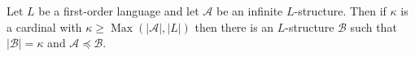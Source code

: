 \documentclass[12pt]{article}
\newcommand{\card}[1]{\lvert #1 \rvert}
\begin{document}
Let $L$ be a first-order language and let $\mathcal{A}$ be an infinite $L$-structure.  Then if $\kappa$ is a cardinal with $\kappa\geq\operatorname{Max}(\card{\mathcal{A}}, \card{L})$ then there is an $L$-structure $\mathcal{B}$ such that $\card{\mathcal{B}} = \kappa$ and $\mathcal{A} \preccurlyeq \mathcal{B}$.
\end{document}
